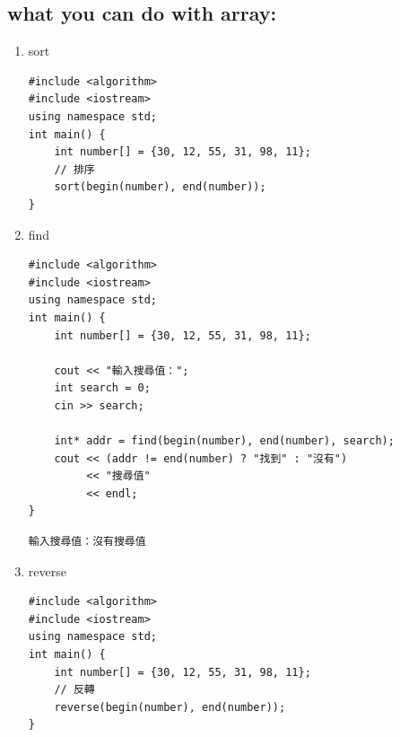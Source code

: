 \documentclass[a4paper,12pt]{article}
\begin{document}
\subsection{what you can do with array:}
\label{sec:org2fefba2}
\begin{enumerate}
\item sort
\label{sec:org0303c3b}
\lstset{breaklines=true,language=cpp,label= ,caption= ,captionpos=b,firstnumber=1,numbers=left}
\begin{lstlisting}
#include <algorithm>
#include <iostream>
using namespace std;
int main() {
    int number[] = {30, 12, 55, 31, 98, 11};
    // 排序
    sort(begin(number), end(number));
}
\end{lstlisting}
\item find
\label{sec:org7ec4313}
\lstset{breaklines=true,language=cpp,label= ,caption= ,captionpos=b,firstnumber=1,numbers=left}
\begin{lstlisting}
#include <algorithm>
#include <iostream>
using namespace std;
int main() {
    int number[] = {30, 12, 55, 31, 98, 11};

    cout << "輸入搜尋值：";
    int search = 0;
    cin >> search;

    int* addr = find(begin(number), end(number), search);
    cout << (addr != end(number) ? "找到" : "沒有")
         << "搜尋值"
         << endl;
}
\end{lstlisting}

\begin{verbatim}
輸入搜尋值：沒有搜尋值
\end{verbatim}

\item reverse
\label{sec:org8108c98}
\lstset{breaklines=true,language=cpp,label= ,caption= ,captionpos=b,firstnumber=1,numbers=left}
\begin{lstlisting}
#include <algorithm>
#include <iostream>
using namespace std;
int main() {
    int number[] = {30, 12, 55, 31, 98, 11};
    // 反轉
    reverse(begin(number), end(number));
}
\end{lstlisting}
\end{enumerate}
\end{document}
